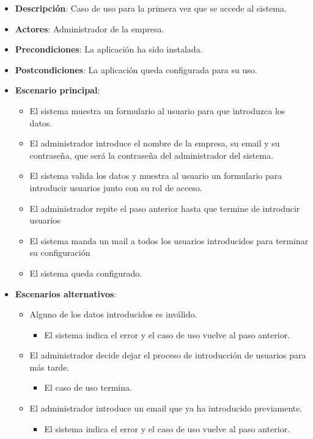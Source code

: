 \documentclass[12pt,a4paperpaper,]{report}
\providecommand{\tightlist}{%
  \setlength{\itemsep}{0pt}\setlength{\parskip}{0pt}}
\begin{document}
\begin{itemize}
\tightlist
\item
  \textbf{Descripción}: Caso de uso para la primera vez que se accede al
  sistema.
\item
  \textbf{Actores}: Administrador de la empresa.
\item
  \textbf{Precondiciones}: La aplicación ha sido instalada.
\item
  \textbf{Postcondiciones}: La aplicación queda configurada para su uso.
\item
  \textbf{Escenario principal}:

  \begin{itemize}
  \tightlist
  \item
    El sistema muestra un formulario al usuario para que introduzca los
    datos.
  \item
    El administrador introduce el nombre de la empresa, su email y su
    contraseña, que será la contraseña del administrador del sistema.
  \item
    El sistema valida los datos y muestra al usuario un formulario para
    introducir usuarios junto con su rol de acceso.
  \item
    El administrador repite el paso anterior hasta que termine de
    introducir usuarios
  \item
    El sistema manda un mail a todos los usuarios introducidos para
    terminar su configuración
  \item
    El sistema queda configurado.
  \end{itemize}
\item
  \textbf{Escenarios alternativos}:

  \begin{itemize}
  \tightlist
  \item
    Alguno de los datos introducidos es inválido.

    \begin{itemize}
    \tightlist
    \item
      El sistema indica el error y el caso de uso vuelve al paso
      anterior.
    \end{itemize}
  \item
    El administrador decide dejar el proceso de introducción de usuarios
    para más tarde.

    \begin{itemize}
    \tightlist
    \item
      El caso de uso termina.
    \end{itemize}
  \item
    El administrador introduce un email que ya ha introducido
    previamente.

    \begin{itemize}
    \tightlist
    \item
      El sistema indica el error y el caso de uso vuelve al paso
      anterior.
    \end{itemize}
  \end{itemize}
\end{itemize}
\end{document}

